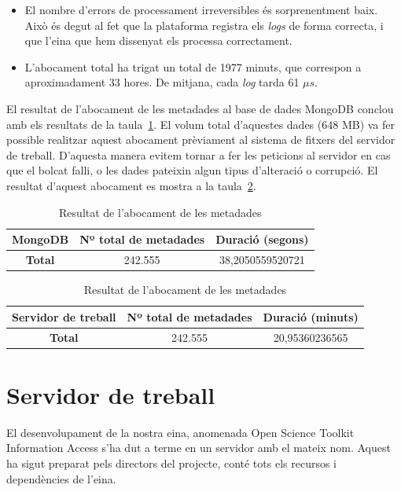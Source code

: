 \documentclass[lettersize,journal]{IEEEtran}
\begin{document}
\begin{itemize}
    \item El nombre d'errors de processament irreversibles és sorprenentment baix.
    Això és degut al fet que la plataforma registra els \textit{logs} de forma correcta, i que l'eina que hem dissenyat els processa correctament.
    \item L'abocament total ha trigat un total de 1977 minuts, que correspon a aproximadament 33 hores.
    De mitjana, cada \textit{log} tarda 61 \(\mu s\).
\end{itemize}

El resultat de l'abocament de les metadades al base de dades MongoDB conclou amb els resultats de la taula~\ref{tab:table2}.
El volum total d'aquestes dades (648 MB) va fer possible realitzar aquest abocament prèviament al sistema de fitxers del servidor de treball.
D'aquesta manera evitem tornar a fer les peticions al servidor en cas que el bolcat falli, o les dades pateixin algun tipus d'alteració o corrupció.
El resultat d'aquest abocament es mostra a la taula~\ref{tab:table3}.

\begin{table}[!t]
    \caption{Resultat de l'abocament de les metadades\label{tab:table2}}
    \centering
    \begin{tabular}{|c|c|c|}
        \hline
        MongoDB & Nº total de metadades & Duració (segons)\\
        \hline
        \textbf{Total} & 242.555 & 38,2050559520721\\
        \hline
    \end{tabular}
\end{table}

\begin{table}[!t]
    \caption{Resultat de l'abocament de les metadades\label{tab:table3}}
    \centering
    \begin{tabular}{|c|c|c|}
        \hline
        Servidor de treball & Nº total de metadades & Duració (minuts)\\
        \hline
        \textbf{Total} & 242.555 & 20,95360236565\\
        \hline
    \end{tabular}
\end{table}

\section{Servidor de treball}\label{sec:server-ostia}
El desenvolupament de la nostra eina, anomenada Open Science Toolkit Information Access s'ha dut a terme en un servidor amb el mateix nom.
Aquest ha sigut preparat pels directors del projecte, conté tots els recursos i dependències de l'eina.
\end{document}
